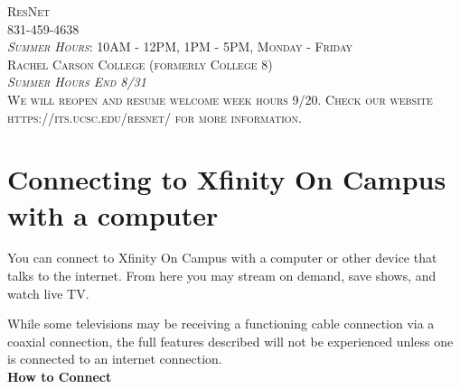 \documentclass[a4paper, 11pt]{article}
\begin{document}
\begin{titlepage}
	{\scshape ResNet \\ 831-459-4638 \\
          \textit{Summer Hours}: 10AM - 12PM, 1PM - 5PM, Monday - Friday \\
          Rachel Carson College (formerly College 8) \\
          \vfill
          \vfill
          \vfill
          \textit{Summer Hours End 8/31}\\ 
          We will reopen and resume welcome week hours 9/20.  Check our
          website https://its.ucsc.edu/resnet/ for more information. 
  } %
	
	\vfill %
	

\end{titlepage}




\section*{
  Connecting to Xfinity On Campus with a computer
}

You can connect to Xfinity On Campus with a computer or other device that
talks to the internet.  From here you may stream on demand, save shows, and 
watch live TV. 

While some televisions may be receiving a functioning cable connection via
a coaxial connection, the full features described will not be 
experienced unless one is connected to an internet connection.\\
{\newline}
\textbf{How to Connect}
\end{document}
